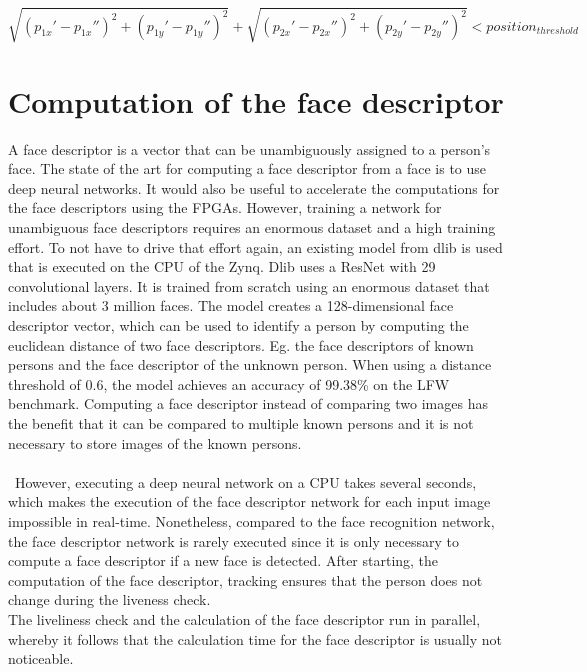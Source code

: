 \documentclass[%
a4paper,
twoside,
openany,
dvipsnames
]
{report}
\begin{document}
\begin{equation}
	\sqrt{(p_{1x}' - p_{1x}'')^2 + (p_{1y}' - p_{1y}'')^2} + \sqrt{(p_{2x}' - p_{2x}'')^2 + (p_{2y}' - p_{2y}'')^2} < position_{threshold}
	\label{eq:tracking}
\end{equation}

\section{Computation of the face descriptor}
A face descriptor is a vector that can be unambiguously assigned to a person's face. The state of the art for computing a face descriptor from a face is to use deep neural networks. It would also be useful to accelerate the computations for the face descriptors using the \glspl{FPGA}. However, training a network for unambiguous face descriptors requires an enormous dataset and a high training effort. To not have to drive that effort again, an existing model from dlib is used that is executed on the \gls{CPU} of the Zynq. Dlib uses a ResNet with 29 convolutional layers. It is trained from scratch using an enormous dataset that includes about 3 million faces. The model creates a 128-dimensional face descriptor vector, which can be used to identify a person by computing the euclidean distance of two face descriptors. Eg. the face descriptors of known persons and the face descriptor of the unknown person. When using a distance threshold of 0.6, the model achieves an accuracy of 99.38\% on the LFW benchmark. Computing a face descriptor instead of comparing two images has the benefit that it can be compared to multiple known persons and it is not necessary to store images of the known persons.  \\
\\\
However, executing a deep neural network on a \gls{CPU} takes several seconds, which makes the execution of the face descriptor network for each input image impossible in real-time. Nonetheless, compared to the face recognition network, the face descriptor network is rarely executed since it is only necessary to compute a face descriptor if a new face is detected. After starting, the computation of the face descriptor, tracking ensures that the person does not change during the liveness check. \\ 
The liveliness check and the calculation of the face descriptor run in parallel, whereby it follows that the calculation time for the face descriptor is usually not noticeable. \\
\end{document}
